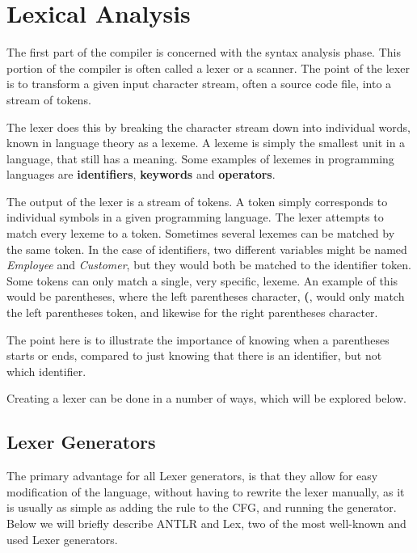 \section{Lexical Analysis}
The first part of the compiler is concerned with the syntax analysis phase.
This portion of the compiler is often called a lexer or a scanner.
The point of the lexer is to transform a given input character stream, often a source code file, into a stream of tokens.

The lexer does this by breaking the character stream down into individual words, known in language theory as a lexeme.
A lexeme is simply the smallest unit in a language, that still has a meaning.
Some examples of lexemes in programming languages are \textbf{identifiers}, \textbf{keywords} and \textbf{operators}.

The output of the lexer is a stream of tokens.
A token simply corresponds to individual symbols in a given programming language.
The lexer attempts to match every lexeme to a token.
Sometimes several lexemes can be matched by the same token.
In the case of identifiers, two different variables might be named \textit{Employee} and \textit{Customer}, but they would both be matched to the identifier token.
Some tokens can only match a single, very specific, lexeme.
An example of this would be parentheses, where the left parentheses character, \textbf{(}, would only match the left parentheses token, and likewise for the right parentheses character.

The point here is to illustrate the importance of knowing when a parentheses starts or ends, compared to just knowing that there is an identifier, but not which identifier.

Creating a lexer can be done in a number of ways, which will be explored below.

\subsection{Lexer Generators}
The primary advantage for all Lexer generators, is that they allow for easy modification of the language, without having to rewrite the lexer manually, as it is usually as simple as adding the rule to the CFG, and running the generator.
Below we will briefly describe ANTLR and Lex, two of the most well-known and used Lexer generators.

